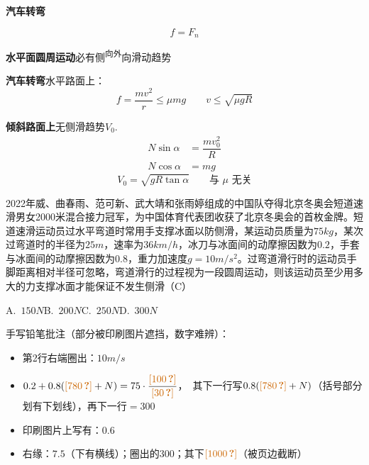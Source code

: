 \textbf{汽车转弯}


\[ f=F_n \]

\textbf{水平面圆周运动}\quad 必有侧\textsuperscript{向外}向滑动趋势

\textbf{汽车转弯}\quad 水平路面上：
\[ f=\dfrac{mv^2}{r}\le\mu mg\qquad v\le\sqrt{\mu gR} \]

\textbf{倾斜路面上}\quad 无侧滑趋势\quad $V_0$.
\begin{align*}
N\sin\alpha&=\dfrac{mv_0^2}{R}\\
N\cos\alpha&=mg
\end{align*}
\[ V_0=\sqrt{gR\tan\alpha}\qquad\text{与 }\mu\text{ 无关} \]

\begin{problem}[贴纸印刷题]
2022年威、曲春雨、范可新、武大靖和张雨婷组成的中国队夺得北京冬奥会短道速滑男女2000米混合接力冠军，为中国体育代表团收获了北京冬奥会的首枚金牌。短道速滑运动员过水平弯道时常用手支撑冰面以防侧滑，某运动员质量为$75\unit{kg}$，某次过弯道时的半径为$25\unit{m}$，速率为$36\unit{km/h}$，冰刀与冰面间的动摩擦因数为$0.2$，手套与冰面间的动摩擦因数为$0.8$，重力加速度$g=10\unit{m/s^2}$。过弯道滑行时的运动员手脚距离相对半径可忽略，弯道滑行的过程视为一段圆周运动，则该运动员至少用多大的力支撑冰面才能保证不发生侧滑（C） %

A.\ $150\unit{N}$\qquad B.\ $200\unit{N}$\qquad C.\ $250\unit{N}$\qquad D.\ $300\unit{N}$

手写铅笔批注（部分被印刷图片遮挡，数字难辨）：
\begin{itemize}
\item 第2行右端圈出：$10\unit{m/s}$
\item $0.2+0.8(\unclear{780}+N)=75\cdot\dfrac{\unclear{100}}{\unclear{30}}$，\ 其下一行写$0.8(\unclear{780}+N)$（括号部分划有下划线），再下一行$=300$ %
\item 印刷图片上写有：$0.6$
\item 右缘：$7.5$（下有横线）；圈出的$300$；其下$\unclear{1000}$（被页边截断）
\end{itemize}
\end{problem}

